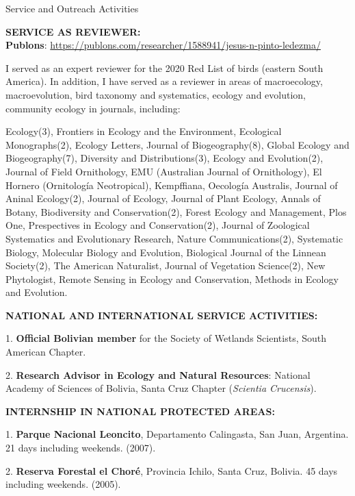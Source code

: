 \documentclass{resume} %
\begin{document}
\begin{rSection}{Service and Outreach Activities}

\textbf{SERVICE AS REVIEWER:} \smallskip \\ 
\textbf{Publons}: \url{https://publons.com/researcher/1588941/jesus-n-pinto-ledezma/}

I served as an expert reviewer for the 2020 Red List of birds (eastern South America). In addition, I have served as a reviewer in areas of macroecology, macroevolution, bird taxonomy and systematics, ecology and evolution, community ecology in journals, including:

Ecology(3), Frontiers in Ecology and the Environment, Ecological Monographs(2), Ecology Letters, Journal of Biogeography(8), Global Ecology and Biogeography(7), Diversity and Distributions(3), Ecology and Evolution(2), Journal of Field Ornithology, EMU (Australian Journal of Ornithology), El Hornero (Ornitología Neotropical), Kempffiana, Oecología Australis, Journal of Aninal Ecology(2), Journal of Ecology, Journal of Plant Ecology, Annals of Botany, Biodiversity and Conservation(2), Forest Ecology and Management, Plos One, Prespectives in Ecology and Conservation(2), Journal of Zoological Systematics and Evolutionary Research, Nature Communications(2), Systematic Biology, Molecular Biology and Evolution, Biological Journal of the Linnean Society(2), The American Naturalist, Journal of Vegetation Science(2), New Phytologist, Remote Sensing in Ecology and Conservation, Methods in Ecology and Evolution. 


\textbf{NATIONAL AND INTERNATIONAL SERVICE ACTIVITIES:} \smallskip 
\item 1. \textbf{Official Bolivian member} for the Society of Wetlands Scientists, South American Chapter. 
\item 2. \textbf{Research Advisor in Ecology and Natural Resources}: National Academy of Sciences of Bolivia, Santa Cruz Chapter ({\em Scientia Crucensis}). 

\textbf{INTERNSHIP IN NATIONAL PROTECTED AREAS:} \smallskip 
\item 1. \textbf{Parque Nacional Leoncito}, Departamento Calingasta, San Juan, Argentina. 21 days including weekends. (2007).
\item 2. \textbf{Reserva Forestal el Choré}, Provincia Ichilo, Santa Cruz, Bolivia. 45 days including weekends. (2005). 


\end{rSection}
\end{document}
